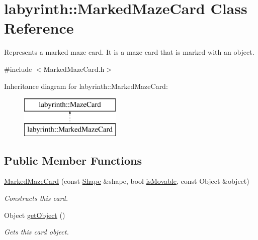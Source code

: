 \hypertarget{classlabyrinth_1_1_marked_maze_card}{}\section{labyrinth\+::Marked\+Maze\+Card Class Reference}
\label{classlabyrinth_1_1_marked_maze_card}


Represents a marked maze card. It is a maze card that is marked with an object.  




{\ttfamily \#include $<$Marked\+Maze\+Card.\+h$>$}

Inheritance diagram for labyrinth\+::Marked\+Maze\+Card\+:\begin{figure}[H]
\begin{center}
\leavevmode
\includegraphics[height=2.000000cm]{classlabyrinth_1_1_marked_maze_card}
\end{center}
\end{figure}
\subsection*{Public Member Functions}
\begin{DoxyCompactItemize}
\item 
\mbox{\hyperlink{classlabyrinth_1_1_marked_maze_card_a0df55f80d2337e74be4bd7c8b9fabb85}{Marked\+Maze\+Card}} (const \mbox{\hyperlink{structlabyrinth_1_1_maze_card_1_1_shape}{Shape}} \&shape, bool \mbox{\hyperlink{structlabyrinth_1_1_maze_card_ae4c534a31b1ac1616d7116d9eb1a39fd}{is\+Movable}}, const Object \&object)
\begin{DoxyCompactList}\small\item\em Constructs this card. \end{DoxyCompactList}\item 
Object \mbox{\hyperlink{classlabyrinth_1_1_marked_maze_card_a481d885e6c9d40ef298e0cba295fd625}{get\+Object}} ()
\begin{DoxyCompactList}\small\item\em Gets this card object. \end{DoxyCompactList}\end{DoxyCompactItemize}
